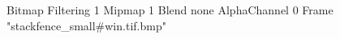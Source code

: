 {Bitmap
	{Filtering 1}
	{Mipmap 1}
	{Blend none}
	{AlphaChannel 0}
	{Frame "stackfence_small#win.tif.bmp"}
}
